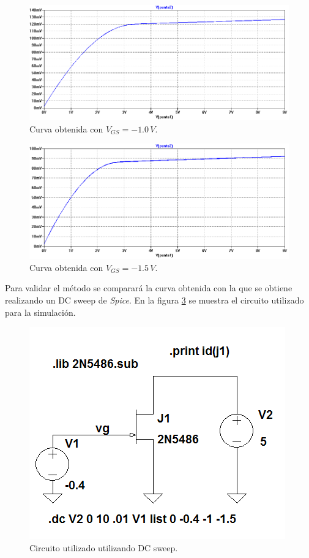 \documentclass[10pt,spanish,a4paper,notitlepage]{article}
\begin{document}
\begin{figure}[H]
\centering
\includegraphics[scale=0.6]{simulaciones/2_vgs-1_sim.png}
\caption{Curva obtenida con $V_{GS} = -1.0\,\unit{V}$.}
\label{fig:simulacion_jfet_1}
\end{figure}

\begin{figure}[H]
\centering
\includegraphics[scale=0.6]{simulaciones/2_vgs-15_sim.png}
\caption{Curva obtenida con $V_{GS} = -1.5\,\unit{V}$.}
\label{fig:simulacion_jfet_15}
\end{figure}

Para validar el método se comparará la curva obtenida con la que se obtiene realizando
un DC sweep de \emph{Spice}. En la figura \ref{fig:jfet_DCsweep} se muestra el circuito utilizado  para la simulación.

\begin{figure}[H]
\centering
\includegraphics[scale=0.6]{circuitos/2_banco_dcsweep.png}
\caption{Circuito utilizado utilizando DC sweep.}
\label{fig:jfet_DCsweep}
\end{figure}
\end{document}
